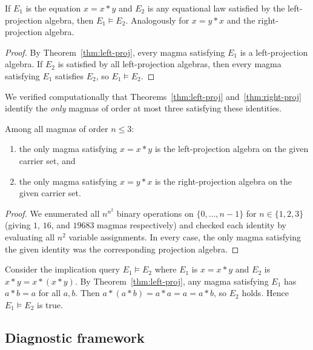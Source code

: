 \begin{corollary}\label{cor:proj-implies}
If $E_1$ is the equation $x = x * y$ and $E_2$ is any equational law
satisfied by the left-projection algebra, then $E_1 \models E_2$.
Analogously for $x = y * x$ and the right-projection algebra.
\end{corollary}

\begin{proof}
By Theorem~\ref{thm:left-proj}, every magma satisfying $E_1$ is a
left-projection algebra.  If $E_2$ is satisfied by all left-projection
algebras, then every magma satisfying $E_1$ satisfies $E_2$, so
$E_1 \models E_2$.
\end{proof}

We verified computationally that Theorems~\ref{thm:left-proj}
and~\ref{thm:right-proj} identify the \emph{only} magmas of order
at most three satisfying these identities.

\begin{proposition}\label{prop:enum}
Among all magmas of order $n \leq 3$:
\begin{enumerate}[label=(\roman*)]
\item the only magma satisfying $x = x * y$ is the left-projection
  algebra on the given carrier set, and
\item the only magma satisfying $x = y * x$ is the right-projection
  algebra on the given carrier set.
\end{enumerate}
\end{proposition}

\begin{proof}
We enumerated all $n^{n^2}$ binary operations on $\{0, \ldots, n-1\}$
for $n \in \{1, 2, 3\}$ (giving $1$, $16$, and $19683$ magmas
respectively) and checked each identity by evaluating all $n^2$
variable assignments.  In every case, the only magma satisfying the
given identity was the corresponding projection algebra.
\end{proof}

\begin{example}\label{ex:proj-use}
Consider the implication query $E_1 \models E_2$ where $E_1$ is
$x = x * y$ and $E_2$ is $x * y = x * (x * y)$.  By
Theorem~\ref{thm:left-proj}, any magma satisfying $E_1$ has
$a * b = a$ for all $a, b$.  Then $a * (a * b) = a * a = a = a * b$,
so $E_2$ holds.  Hence $E_1 \models E_2$ is true.
\end{example}

\subsection{Diagnostic framework}\label{subsec:diagnostic}

